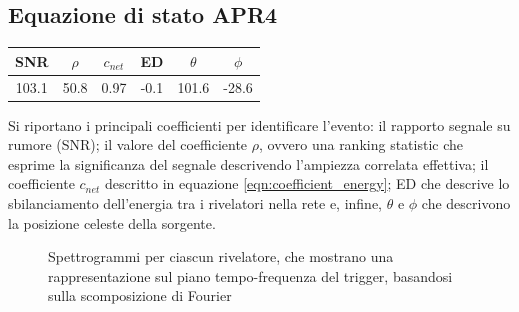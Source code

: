 \subsection{Equazione di stato APR4}
\label{subsection:APR4}
\begin{table}
	\vspace{-8pt}
	\begin{tabular}{cccccc}
		\toprule
		SNR	&$\rho$	&$c_{net}$	&ED	&$\theta$	&$\phi$	\\
		\midrule
		103.1	&50.8	&0.97	&-0.1	&101.6	&-28.6	\\
		\bottomrule
	\end{tabular}
	\vspace{-5pt}
\end{table}
Si riportano i principali coefficienti per identificare l'evento: il rapporto segnale su rumore (SNR); il valore del coefficiente $\rho$, ovvero una ranking statistic che esprime la significanza del segnale descrivendo l'ampiezza correlata effettiva; il coefficiente $c_{net}$ descritto in equazione \ref{eqn:coefficient_energy}; ED che descrive lo sbilanciamento dell'energia tra i rivelatori nella rete e, infine, $\theta$ e $\phi$ che descrivono la posizione celeste della sorgente.
\begin{figure}[ht]
	\vspace{-10pt}
	\centering
	\vspace{-5pt}
	\caption{Spettrogrammi per ciascun rivelatore, che mostrano una rappresentazione sul piano tempo-frequenza del trigger, basandosi sulla scomposizione di Fourier}
	\label{fig:spettrogramma_apr4}
	\vspace{-15pt}
\end{figure}

